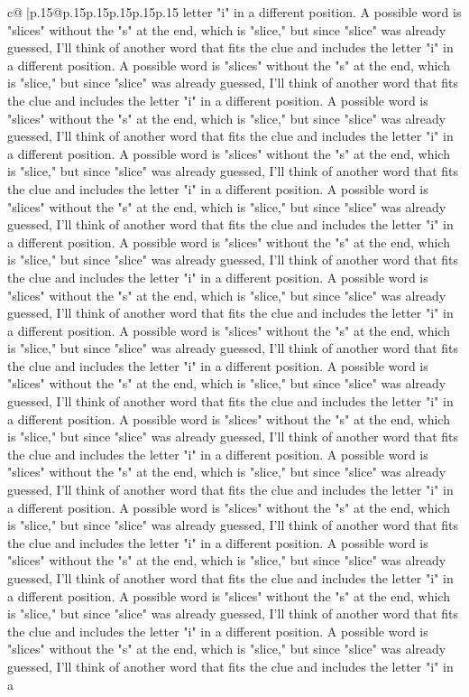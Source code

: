 \documentclass{article}
\begin{document}
{\begin{supertabular}{c@{$\;$}|p{.15\linewidth}@{}p{.15\linewidth}p{.15\linewidth}p{.15\linewidth}p{.15\linewidth}p{.15\linewidth}}
{{{letter "i" in a different position. A possible word is "slices" without the "s" at the end, which is "slice," but since "slice" was already guessed, I'll think of another word that fits the clue and includes the letter "i" in a different position. A possible word is "slices" without the "s" at the end, which is "slice," but since "slice" was already guessed, I'll think of another word that fits the clue and includes the letter "i" in a different position. A possible word is "slices" without the "s" at the end, which is "slice," but since "slice" was already guessed, I'll think of another word that fits the clue and includes the letter "i" in a different position. A possible word is "slices" without the "s" at the end, which is "slice," but since "slice" was already guessed, I'll think of another word that fits the clue and includes the letter "i" in a different position. A possible word is "slices" without the "s" at the end, which is "slice," but since "slice" was already guessed, I'll think of another word that fits the clue and includes the letter "i" in a different position. A possible word is "slices" without the "s" at the end, which is "slice," but since "slice" was already guessed, I'll think of another word that fits the clue and includes the letter "i" in a different position. A possible word is "slices" without the "s" at the end, which is "slice," but since "slice" was already guessed, I'll think of another word that fits the clue and includes the letter "i" in a different position. A possible word is "slices" without the "s" at the end, which is "slice," but since "slice" was already guessed, I'll think of another word that fits the clue and includes the letter "i" in a different position. A possible word is "slices" without the "s" at the end, which is "slice," but since "slice" was already guessed, I'll think of another word that fits the clue and includes the letter "i" in a different position. A possible word is "slices" without the "s" at the end, which is "slice," but since "slice" was already guessed, I'll think of another word that fits the clue and includes the letter "i" in a different position. A possible word is "slices" without the "s" at the end, which is "slice," but since "slice" was already guessed, I'll think of another word that fits the clue and includes the letter "i" in a different position. A possible word is "slices" without the "s" at the end, which is "slice," but since "slice" was already guessed, I'll think of another word that fits the clue and includes the letter "i" in a different position. A possible word is "slices" without the "s" at the end, which is "slice," but since "slice" was already guessed, I'll think of another word that fits the clue and includes the letter "i" in a different position. A possible word is "slices" without the "s" at the end, which is "slice," but since "slice" was already guessed, I'll think of another word that fits the clue and includes the letter "i" in a different position. A possible word is "slices" without the "s" at the end, which is "slice," but since "slice" was already guessed, I'll think of another word that fits the clue and includes the letter "i" in a }}}
\end{supertabular}}
\end{document}
